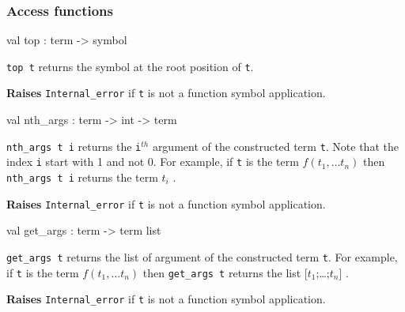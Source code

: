 \subsubsection{Access functions}




\label{val:Term.top}\begin{ocamldoccode}
val top : term -> symbol
\end{ocamldoccode}
\begin{ocamldocdescription}
{\tt{top t}} returns the symbol at the root position of {\tt{t}}.

{\bf Raises} {\tt{Internal\_error}} if {\tt{t}} is not a function symbol application.


\end{ocamldocdescription}




\label{val:Term.nth-underscoreargs}\begin{ocamldoccode}
val nth_args : term -> int -> term
\end{ocamldoccode}
\begin{ocamldocdescription}
{\tt{nth\_args t i}} returns the {\tt{i}}$^{th}$ argument of the constructed term {\tt{t}}.  
    Note that the index {\tt{i}} start with 1 and not 0. For example, if {\tt{t}} is the term $f(t_1,\ldots t_n)$ 
    then {\tt{nth\_args t i}} returns the term $t_i$ .

{\bf Raises} {\tt{Internal\_error}} if {\tt{t}} is not a function symbol application.


\end{ocamldocdescription}




\label{val:Term.get-underscoreargs}\begin{ocamldoccode}
val get_args : term -> term list
\end{ocamldoccode}
\begin{ocamldocdescription}
{\tt{get\_args t}} returns the list of argument of the constructed term {\tt{t}}. For example, if {\tt{t}} is the term $f(t_1,\ldots t_n)$ 
    then {\tt{get\_args t}} returns the list [$t_1$;\ldots;$t_n$] .

{\bf Raises} {\tt{Internal\_error}} if {\tt{t}} is not a function symbol application.


\end{ocamldocdescription}




